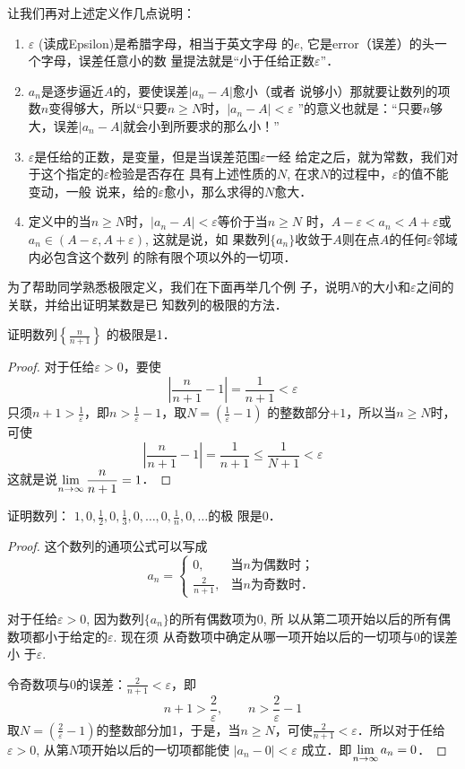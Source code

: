 让我们再对上述定义作几点说明：
\begin{enumerate}
\item $\varepsilon$ (读成Epsilon)是希腊字母，相当于英文字母
的$e$, 它是error（误差）的头一个字母，误差任意小的数
量提法就是“小于任给正数$\varepsilon$”．
\item $a_n$是逐步逼近$A$的，要使误差$|a_n-A|$愈小（或者
说够小）那就要让数列的项数$n$变得够大，所以“只要$n\ge
N$时，$|a_n-A|<\varepsilon$ ”的意义也就是：“只要$n$够大，误差$|a_n
-A|$就会小到所要求的那么小！”
\item $\varepsilon$是任给的正数，是变量，但是当误差范围$\varepsilon$一经
给定之后，就为常数，我们对于这个指定的$\varepsilon$检验是否存在
具有上述性质的$N$, 在求$N$的过程中，$\varepsilon$的值不能变动，一般
说来，给的$\varepsilon$愈小，那么求得的$N$愈大．
\item 定义中的当$n\ge N$时，$|a_n-A|<\varepsilon$等价于当$n\ge N$
时，$A-\varepsilon<a_n<A+\varepsilon$或$a_n\in (A-\varepsilon,A+\varepsilon)$, 这就是说，如
果数列$\{a_n\}$收敛于$A$则在点$A$的任何$\varepsilon$邻域内必包含这个数列
的除有限个项以外的一切项．
\end{enumerate}


为了帮助同学熟悉极限定义，我们在下面再举几个例
子，说明$N$的大小和$\varepsilon$之间的关联，并给出证明某数是已
知数列的极限的方法．

\begin{example}
    证明数列$\left\{\frac{n}{n+1}\right\}$
的极限是1．
\end{example}

\begin{proof}
对于任给$\varepsilon>0$，要使
\[\left|\frac{n}{n+1}-1\right|=\frac{1}{n+1}<\varepsilon\]
只须$n+1>\frac{1}{\varepsilon}$，即$n>\frac{1}{\varepsilon}-1$，取$N=\left(\frac{1}{\varepsilon}-1\right)$
的整数部分$+1$，所以当$n\ge N$时，可使
\[\left|\frac{n}{n+1}-1\right|=\frac{1}{n+1}\le \frac{1}{N+1}<\varepsilon\]
    这就是说$\displaystyle\lim_{n\to\infty}\dfrac{n}{n+1}=1$．
\end{proof}

\begin{example}
    证明数列：
$1,0,\frac{1}{2},0,\frac{1}{3},0,\ldots,0,\frac{1}{n},0,\ldots$的极
限是0．
\end{example}

\begin{proof}
  这个数列的通项公式可以写成
\[a_n=\begin{cases}
    0,& \text{当$n$为偶数时；}\\
   \frac{2}{n+1},& \text{当$n$为奇数时．}
\end{cases}\]

对于任给$\varepsilon>0$, 因为数列$\{a_n\}$的所有偶数项为0, 所
以从第二项开始以后的所有偶数项都小于给定的$\varepsilon$. 现在须
从奇数项中确定从哪一项开始以后的一切项与0的误差小
于$\varepsilon$. 

令奇数项与0的误差：$\frac{2}{n+1}<\varepsilon$，即
\[n+1>\frac{2}{\varepsilon},\qquad n>\frac{2}{\varepsilon}-1\]  
取$N=\left(\frac{2}{\varepsilon}-1\right)$的整数部分加1，于是，当$n\ge N$，可使$\frac{2}{n+1}<\varepsilon$．所以对于任给$\varepsilon>0$, 从第$N$项开始以后的一切项都能使
$|a_n-0|<\varepsilon$
成立．即$\displaystyle\lim_{n\to\infty}a_n=0$．
\end{proof}


